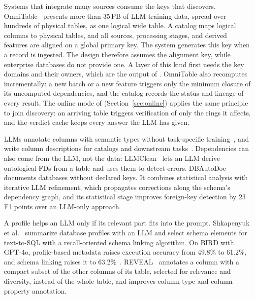  Systems that integrate many sources consume the keys that \ourmethod discovers.
OmniTable~\cite{OmniTable} presents more than 35\,PB of LLM training data, spread over hundreds of physical tables, as one logical wide table.
A catalog maps logical columns to physical tables, and all sources, processing stages, and derived features are aligned on a global primary key.
The system generates this key when a record is ingested.
The design therefore assumes the alignment key, while enterprise databases do not provide one.
A layer of this kind first needs the key domains and their owners, which are the output of \ourmethod.
OmniTable also recomputes incrementally: a new batch or a new feature triggers only the minimum closure of its uncomputed dependencies, and the catalog records the status and lineage of every result.
The online mode of \ourmethod (Section~\ref{sec:online}) applies the same principle to join discovery: an arriving table triggers verification of only the rings it affects, and the verdict cache keeps every answer the LLM has given.

 LLMs annotate columns with semantic types without task-specific training~\cite{DBLP:conf/vldb/KoriniB23,ArcheType}, and write column descriptions for catalogs and downstream tasks~\cite{TACO}.
Dependencies can also come from the LLM, not the data: LLMClean~\cite{LLMClean} lets an LLM derive ontological FDs from a table and uses them to detect errors.
DBAutoDoc~\cite{DBAutoDoc} documents databases without declared keys.
It combines statistical analysis with iterative LLM refinement, which propagates corrections along the schema's dependency graph, and its statistical stage improves foreign-key detection by 23 F1 points over an LLM-only approach.

 A profile helps an LLM only if its relevant part fits into the prompt.
Shkapenyuk et al.~\cite{AutoMetadataT2S} summarize database profiles with an LLM and select schema elements for text-to-SQL with a recall-oriented schema linking algorithm.
On BIRD with GPT-4o, profile-based metadata raises execution accuracy from 49.8\% to 61.2\%, and schema linking raises it to 63.2\%~\cite{AutoMetadataT2S}.
REVEAL~\cite{REVEAL} annotates a column with a compact subset of the other columns of its table, selected for relevance and diversity, instead of the whole table, and improves column type and column property annotation.

